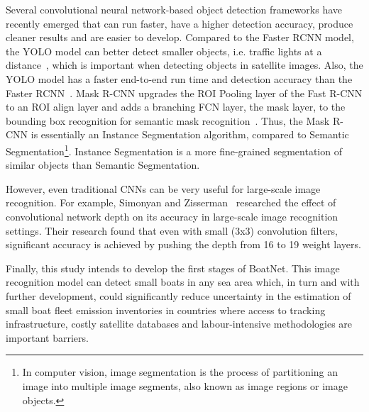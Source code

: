 Several convolutional neural network-based object detection frameworks have recently emerged that can run faster, have a higher detection accuracy, produce cleaner results and are easier to develop. Compared to the Faster RCNN model, the YOLO model can better detect smaller objects, i.e. traffic lights at a distance~\cite{Dwivedi2020YOLOv5}, which is important when detecting objects in satellite images. Also, the YOLO model has a faster end-to-end run time and detection accuracy than the Faster RCNN~\cite{Dwivedi2020YOLOv5}. Mask R-CNN upgrades the ROI Pooling layer of the Fast R-CNN to an ROI align layer and adds a branching FCN layer, the mask layer, to the bounding box recognition for semantic mask recognition~\cite{he2017mask}. Thus, the Mask R-CNN is essentially an Instance Segmentation algorithm, compared to Semantic Segmentation\footnote{In computer vision, image segmentation is the process of partitioning an image into multiple image segments, also known as image regions or image objects.}. Instance Segmentation is a more fine-grained segmentation of similar objects than Semantic Segmentation.

However, even traditional CNNs can be very useful for large-scale image recognition. For example, Simonyan and Zisserman~\cite{Simonyan2015VeryDC} researched the effect of convolutional network depth on its accuracy in large-scale image recognition settings. Their research found that even with small (3x3) convolution filters, significant accuracy is achieved by pushing the depth from 16 to 19 weight layers.

Finally, this study intends to develop the first stages of BoatNet. This image recognition model can detect small boats in any sea area which, in turn and with further development, could significantly reduce uncertainty in the estimation of small boat fleet emission inventories in countries where access to tracking infrastructure, costly satellite databases and labour-intensive methodologies are important barriers.
